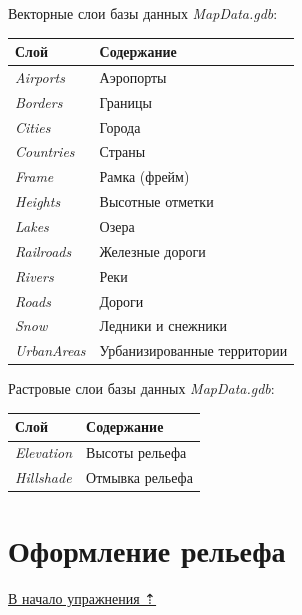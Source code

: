 \documentclass[]{book}
\theoremstyle{definition}
\theoremstyle{definition}
\theoremstyle{definition}
\theoremstyle{remark}
\begin{document}
Векторные слои базы данных \emph{MapData.gdb}:

\begin{longtable}[]{@{}ll@{}}
\toprule
Слой & Содержание\tabularnewline
\midrule
\endhead
\emph{Airports} & Аэропорты\tabularnewline
\emph{Borders} & Границы\tabularnewline
\emph{Cities} & Города\tabularnewline
\emph{Countries} & Страны\tabularnewline
\emph{Frame} & Рамка (фрейм)\tabularnewline
\emph{Heights} & Высотные отметки\tabularnewline
\emph{Lakes} & Озера\tabularnewline
\emph{Railroads} & Железные дороги\tabularnewline
\emph{Rivers} & Реки\tabularnewline
\emph{Roads} & Дороги\tabularnewline
\emph{Snow} & Ледники и снежники\tabularnewline
\emph{UrbanAreas} & Урбанизированные территории\tabularnewline
\bottomrule
\end{longtable}

Растровые слои базы данных \emph{MapData.gdb}:

\begin{longtable}[]{@{}ll@{}}
\toprule
Слой & Содержание\tabularnewline
\midrule
\endhead
\emph{Elevation} & Высоты рельефа\tabularnewline
\emph{Hillshade} & Отмывка рельефа\tabularnewline
\bottomrule
\end{longtable}

\hypertarget{map-design-general-relief}{%
\section{Оформление рельефа}\label{map-design-general-relief}}

\protect\hyperlink{map-design-general}{В начало упражнения ⇡}
\end{document}
